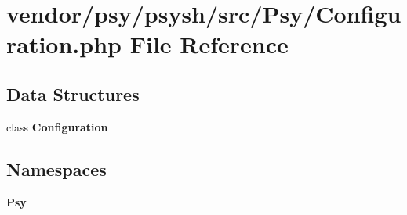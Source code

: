 \section{vendor/psy/psysh/src/\+Psy/\+Configuration.php File Reference}
\label{psy_2psysh_2src_2_psy_2_configuration_8php}
\subsection*{Data Structures}
\begin{DoxyCompactItemize}
\item 
class {\bf Configuration}
\end{DoxyCompactItemize}
\subsection*{Namespaces}
\begin{DoxyCompactItemize}
\item 
 {\bf Psy}
\end{DoxyCompactItemize}
